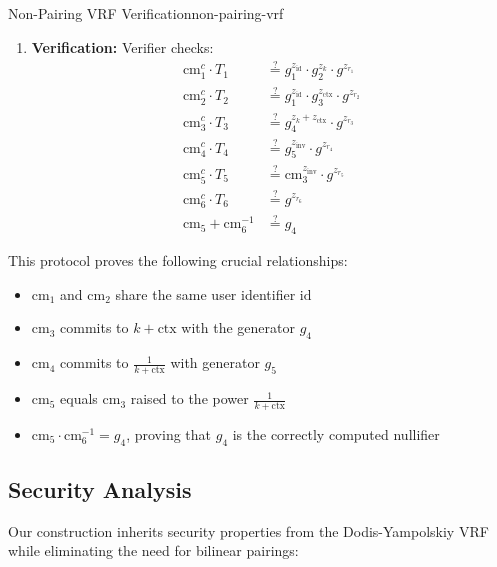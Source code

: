 \begin{protocol}{Non-Pairing VRF Verification}{non-pairing-vrf}
\begin{enumerate}
    Sends $(z_{\text{id}}, z_k, z_{\text{ctx}}, z_{\text{inv}}, z_{r_1}, \ldots, z_{r_6})$ to verifier.
    
    \item \textbf{Verification:} Verifier checks:
    \begin{align}
        \text{cm}_1^c \cdot T_1 &\stackrel{?}{=} g_1^{z_{\text{id}}} \cdot g_2^{z_k} \cdot g^{z_{r_1}} \\
        \text{cm}_2^c \cdot T_2 &\stackrel{?}{=} g_1^{z_{\text{id}}} \cdot g_3^{z_{\text{ctx}}} \cdot g^{z_{r_2}} \\
        \text{cm}_3^c \cdot T_3 &\stackrel{?}{=} g_4^{z_k + z_{\text{ctx}}} \cdot g^{z_{r_3}} \\
        \text{cm}_4^c \cdot T_4 &\stackrel{?}{=} g_5^{z_{\text{inv}}} \cdot g^{z_{r_4}} \\
        \text{cm}_5^c \cdot T_5 &\stackrel{?}{=} \text{cm}_3^{z_{\text{inv}}} \cdot g^{z_{r_5}} \\
        \text{cm}_6^c \cdot T_6 &\stackrel{?}{=} g^{z_{r_6}} \\
        \text{cm}_5 + \text{cm}_6^{-1} &\stackrel{?}{=} g_4
    \end{align}
\end{enumerate}
\end{protocol}

This protocol proves the following crucial relationships:
\begin{itemize}
    \item $\text{cm}_1$ and $\text{cm}_2$ share the same user identifier $\text{id}$
    \item $\text{cm}_3$ commits to $k + \text{ctx}$ with the generator $g_4$
    \item $\text{cm}_4$ commits to $\frac{1}{k + \text{ctx}}$ with generator $g_5$
    \item $\text{cm}_5$ equals $\text{cm}_3$ raised to the power $\frac{1}{k + \text{ctx}}$
    \item $\text{cm}_5 \cdot \text{cm}_6^{-1} = g_4$, proving that $g_4$ is the correctly computed nullifier
\end{itemize}

\subsection{Security Analysis}

Our construction inherits security properties from the Dodis-Yampolskiy VRF while eliminating the need for bilinear pairings:

